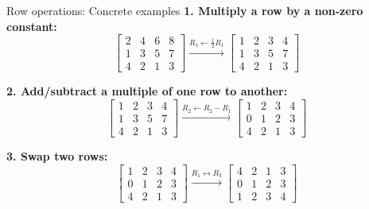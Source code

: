 \documentclass[aspectratio=169, lualatex, handout]{beamer}
\begin{document}
\begin{frame}{Row operations: Concrete examples}
	\small
	\textbf{1. Multiply a row by a non-zero constant:}
	\[
		\left[\begin{array}{ccc|c}
				2 & 4 & 6 & 8 \\
				1 & 3 & 5 & 7 \\
				4 & 2 & 1 & 3
			\end{array}\right]
		\xrightarrow{R_1 \leftarrow \frac{1}{2}R_1}
		\left[\begin{array}{ccc|c}
				1 & 2 & 3 & 4 \\
				1 & 3 & 5 & 7 \\
				4 & 2 & 1 & 3
			\end{array}\right]
	\]

	\textbf{2. Add/subtract a multiple of one row to another:}
	\[
		\left[\begin{array}{ccc|c}
				1 & 2 & 3 & 4 \\
				1 & 3 & 5 & 7 \\
				4 & 2 & 1 & 3
			\end{array}\right]
		\xrightarrow{R_2 \leftarrow R_2 - R_1}
		\left[\begin{array}{ccc|c}
				1 & 2 & 3 & 4 \\
				0 & 1 & 2 & 3 \\
				4 & 2 & 1 & 3
			\end{array}\right]
	\]

	\textbf{3. Swap two rows:}
	\[
		\left[\begin{array}{ccc|c}
				1 & 2 & 3 & 4 \\
				0 & 1 & 2 & 3 \\
				4 & 2 & 1 & 3
			\end{array}\right]
		\xrightarrow{R_1 \leftrightarrow R_3}
		\left[\begin{array}{ccc|c}
				4 & 2 & 1 & 3 \\
				0 & 1 & 2 & 3 \\
				1 & 2 & 3 & 4
			\end{array}\right]
	\]
\end{frame}
\end{document}
